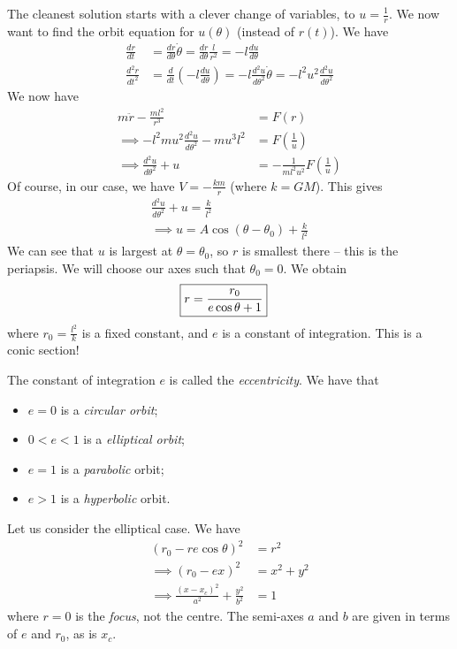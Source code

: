 \documentclass{../template/note}
\begin{document}
    The cleanest solution starts with a clever change of variables, to \(u = \frac 1 r\). We now want to find the orbit equation for \(u(\theta)\) (instead of \(r(t)\)). We have
    \begin{align*}
        \frac{dr}{dt} &= \frac{dr}{d\theta} \dot \theta = \frac{dr}{d\theta} \frac{l}{r^2} = -l \frac{du}{d\theta} \\
        \frac{d^2r}{dt^2} &= \frac{d}{dt}\left(-l \frac{du}{d\theta}\right) = -l \frac{d^2u}{d\theta^2}\dot \theta = -l^2u^2 \frac{d^2u}{d\theta^2}
    \end{align*}
    We now have
    \begin{align*}
        m \ddot r - \frac{ml^2}{r^3} &= F(r) \\
        \implies -l^2mu^2 \frac{d^2u}{d\theta^2} - mu^3l^2 &= F\left(\frac 1 u\right) \\
        \implies \frac{d^2u}{d\theta^2} + u &= -\frac{1}{ml^2u^2}F\left(\frac 1 u\right)
    \end{align*}
    Of course, in our case, we have \(V = -\frac{km}{r}\) (where \(k = GM\)). This gives
    \begin{align*}
        \frac{d^2u}{d\theta^2} + u = \frac{k}{l^2} \\
        \implies u = A \cos (\theta - \theta_0) + \frac{k}{l^2}
    \end{align*}
    We can see that \(u\) is largest at \(\theta = \theta_0\), so \(r\) is smallest there -- this is the periapsis. We will choose our axes such that \(\theta_0 = 0\). We obtain
    \begin{align*}
        \Aboxed{r = \frac{r_0}{e \cos \theta + 1}}
    \end{align*}
    where \(r_0 = \frac{l^2}{k}\) is a fixed constant, and \(e\) is a constant of integration. This is a conic section!

    The constant of integration \(e\) is called the \emph{eccentricity}. We have that
    \begin{itemize}
        \item \(e = 0\) is a \emph{circular orbit};
        \item \(0 < e < 1\) is a \emph{elliptical orbit};
        \item \(e = 1\) is a \emph{parabolic} orbit;
        \item \(e > 1\) is a \emph{hyperbolic} orbit.
    \end{itemize}
    
    Let us consider the elliptical case. We have
    \begin{align*}
        (r_0 - re\cos \theta)^2 &= r^2 \\
        \implies (r_0-ex)^2 &= x^2 + y^2 \\
        \implies \frac{(x-x_c)^2}{a^2} + \frac{y^2}{b^2} &= 1
    \end{align*}
    where \(r=0\) is the \emph{focus}, not the centre. The semi-axes \(a\) and \(b\) are given in terms of \(e\) and \(r_0\), as is \(x_c\).
\end{document}
